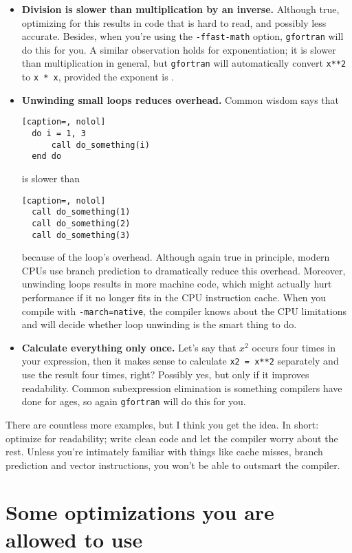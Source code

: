 \begin{itemize}
  \item\textbf{Division is slower than multiplication by an inverse.} Although true, optimizing for this results in code that is hard to read, and possibly less accurate.
    Besides, when you're using the \texttt{-ffast-math} option, \texttt{gfortran} will do this for you.
    A similar observation holds for exponentiation; it is slower than multiplication in general, but \texttt{gfortran} will automatically convert \texttt{x**2} to \texttt{x * x}, provided the exponent is .
  \item\textbf{Unwinding small loops reduces overhead.} Common wisdom says that
\begin{lstlisting}[caption=, nolol]
  do i = 1, 3
      call do_something(i)
  end do
\end{lstlisting}
    is slower than
\begin{lstlisting}[caption=, nolol]
  call do_something(1)
  call do_something(2)
  call do_something(3)
\end{lstlisting}
    because of the loop's overhead.
    Although again true in principle, modern CPUs use branch prediction to dramatically reduce this overhead.
    Moreover, unwinding loops results in more machine code, which might actually hurt performance if it no longer fits in the CPU instruction cache.
    When you compile with \texttt{-march=native}, the compiler knows about the CPU limitations and will decide whether loop unwinding is the smart thing to do.
  \item\textbf{Calculate everything only once.} Let's say that $x^2$ occurs four times in your expression, then it makes sense to calculate \texttt{x2 = x**2} separately and use the result four times, right? Possibly yes, but only if it improves readability.
    Common subexpression elimination is something compilers have done for ages, so again \texttt{gfortran} will do this for you.
\end{itemize}
There are countless more examples, but I think you get the idea.
In short: optimize for readability; write clean code and let the compiler worry about the rest.
Unless you're intimately familiar with things like cache misses, branch prediction and vector instructions, you won't be able to outsmart the compiler.

\section{Some optimizations you are allowed to use}

